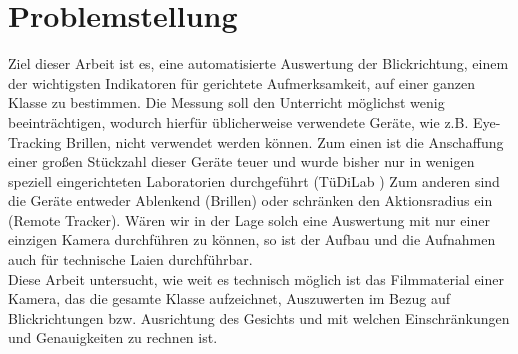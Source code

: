 \section{Problemstellung}
\label{Problemstellung}
Ziel dieser Arbeit ist es, eine automatisierte Auswertung der Blickrichtung, einem der wichtigsten Indikatoren für gerichtete Aufmerksamkeit, auf einer ganzen Klasse zu bestimmen.
Die Messung soll den Unterricht möglichst wenig beeinträchtigen, wodurch hierfür üblicherweise verwendete Geräte, wie z.B. Eye-Tracking Brillen, nicht verwendet werden können.
Zum einen ist die Anschaffung einer großen Stückzahl dieser Geräte teuer und wurde bisher nur in wenigen speziell eingerichteten Laboratorien durchgeführt (TüDiLab \cite{TueDiLab}) Zum anderen sind die Geräte entweder Ablenkend (Brillen) oder schränken den Aktionsradius ein (Remote Tracker).
Wären wir in der Lage solch eine Auswertung mit nur einer einzigen Kamera durchführen zu können, so ist der Aufbau und die Aufnahmen auch für technische Laien durchführbar.\\
Diese Arbeit untersucht, wie weit es technisch möglich ist das Filmmaterial einer Kamera, das die gesamte Klasse aufzeichnet, Auszuwerten im Bezug auf Blickrichtungen bzw. Ausrichtung des Gesichts und mit welchen Einschränkungen und Genauigkeiten zu rechnen ist.\\
\cite{MAI_Verhaltensbeobachtung}